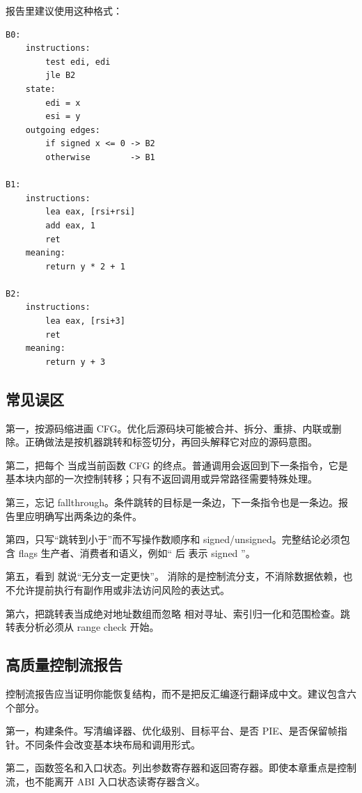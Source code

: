 报告里建议使用这种格式：

\begin{lstlisting}
B0:
    instructions:
        test edi, edi
        jle B2
    state:
        edi = x
        esi = y
    outgoing edges:
        if signed x <= 0 -> B2
        otherwise        -> B1

B1:
    instructions:
        lea eax, [rsi+rsi]
        add eax, 1
        ret
    meaning:
        return y * 2 + 1

B2:
    instructions:
        lea eax, [rsi+3]
        ret
    meaning:
        return y + 3
\end{lstlisting}

\subsection{常见误区}

第一，按源码缩进画 CFG。优化后源码块可能被合并、拆分、重排、内联或删除。正确做法是按机器跳转和标签切分，再回头解释它对应的源码意图。

第二，把每个  当成当前函数 CFG 的终点。普通调用会返回到下一条指令，它是基本块内部的一次控制转移；只有不返回调用或异常路径需要特殊处理。

第三，忘记 fallthrough。条件跳转的目标是一条边，下一条指令也是一条边。报告里应明确写出两条边的条件。

第四，只写“跳转到小于”而不写操作数顺序和 signed/unsigned。完整结论必须包含 flags 生产者、消费者和语义，例如“ 后  表示 signed ”。

第五，看到  就说“无分支一定更快”。 消除的是控制流分支，不消除数据依赖，也不允许提前执行有副作用或非法访问风险的表达式。

第六，把跳转表当成绝对地址数组而忽略  相对寻址、索引归一化和范围检查。跳转表分析必须从 range check 开始。

\subsection{高质量控制流报告}

控制流报告应当证明你能恢复结构，而不是把反汇编逐行翻译成中文。建议包含六个部分。

第一，构建条件。写清编译器、优化级别、目标平台、是否 PIE、是否保留帧指针。不同条件会改变基本块布局和调用形式。

第二，函数签名和入口状态。列出参数寄存器和返回寄存器。即使本章重点是控制流，也不能离开 ABI 入口状态读寄存器含义。

